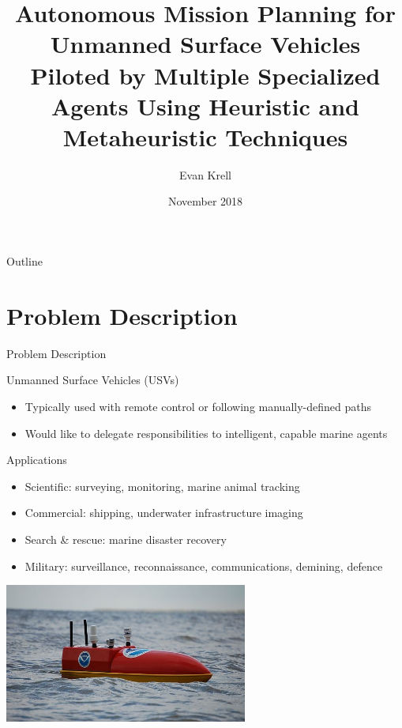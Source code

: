 \documentclass[9pt]{beamer}
\title[PPT - Autonomous Mission Planning for Unmanned Surface Vehicles..]{Autonomous Mission Planning for Unmanned Surface Vehicles Piloted by Multiple Specialized Agents Using Heuristic and Metaheuristic Techniques}
\author{Evan Krell}
\institute{Texas A\&M University - Corpus Christi}
\date{November 2018}
\begin{document}
\begin{frame}
  \titlepage
\end{frame}

\begin{frame}{Outline}
  \tableofcontents
\end{frame}

\section{Problem Description}

\begin{frame}{Problem Description} \label{PD:applications}
    \begin{block}{Unmanned Surface Vehicles (USVs)}
	    \begin{itemize}
    	    \item Typically used with remote control or following manually-defined paths
    	    \item Would like to delegate responsibilities to intelligent, capable marine agents
        \end{itemize}
    \end{block}
    \begin{block}{Applications}
	    \begin{itemize}
    	    \item Scientific: surveying, monitoring, marine animal tracking	    
	        \item Commercial: shipping, underwater infrastructure imaging
	        \item Search \& rescue: marine disaster recovery
    	    \item Military: surveillance, reconnaissance, communications, demining, defence
        \end{itemize}
    \end{block}
    \begin{center}
        \includegraphics[width=0.6\textwidth,trim={1cm 2cm 1cm 1cm},clip]{img/EMILY_NOAA.jpg}
    \end{center}
\end{frame}
\end{document}
